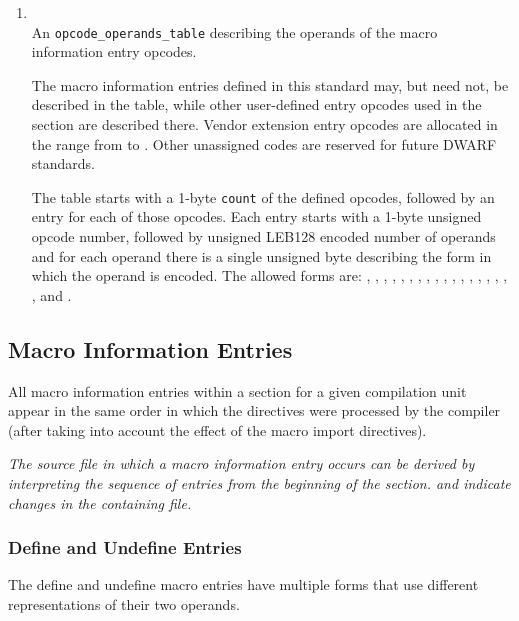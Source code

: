 \begin{enumerate}[1. ]
\item {} \\
An \texttt{opcode\_operands\_table} describing the operands 
of the macro information entry opcodes.

The macro information entries defined in this standard may, but need not, be
described in the table, while other user-defined entry opcodes used in the section
are described there.  Vendor extension entry opcodes are
allocated in the range from \DWMACROlouser{} to \DWMACROhiuser. Other
unassigned codes are reserved for future DWARF standards.

The table starts with a 1-byte \texttt{count} of the defined opcodes, followed by
an entry for each of those opcodes.  Each entry starts with a 1-byte unsigned
opcode number, followed by unsigned LEB128 encoded number of operands
and for each operand there is a single unsigned byte describing the form in which
the operand is encoded.  The allowed forms are: 
\DWFORMblock, \DWFORMblockone, \DWFORMblocktwo, \DWFORMblockfour,
\DWFORMdataone, \DWFORMdatatwo, \DWFORMdatafour, \DWFORMdataeight, 
\DWFORMdatasixteen,  
\DWFORMflag, \DWFORMlinestrp, \DWFORMsdata, 
\DWFORMsecoffset, \DWFORMstring, \DWFORMstrp{},
\bb
\DWFORMstrpeight,
\eb 
\DWFORMstrpsup,
\bb
\DWFORMstrpsupeight,
\eb
\DWFORMstrxXN{} and \DWFORMudata.
\end{enumerate}

\subsection{Macro Information Entries}
\label{chap:macroinformationentries}
All macro information entries within a \dotdebugmacro{}
section for a given compilation unit appear in the same 
order in which the directives were processed by the 
compiler (after taking into account the effect of the
macro import directives).

\textit{The source file in which a macro information entry occurs
can be derived by interpreting the sequence of entries from the
beginning of the \dotdebugmacro{} section. \DWMACROstartfile{} and 
\DWMACROendfile{} indicate changes in the containing file.} 

\subsubsection{Define and Undefine Entries}
\label{chap:defineandundefineentries}
The define and undefine macro entries have multiple forms that
use different representations of their two operands.

